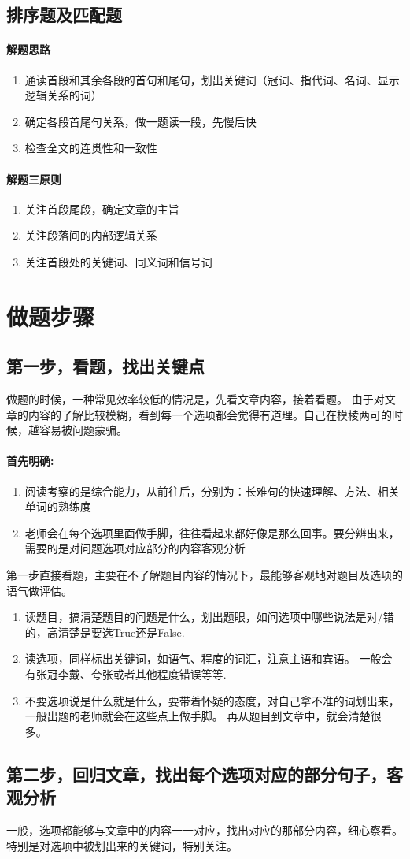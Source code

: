 \documentclass[a4paper]{ctexart}
\begin{document}
\subsection{排序题及匹配题}
\paragraph{解题思路}
\begin{enumerate}
    \item 通读首段和其余各段的首句和尾句，划出关键词（冠词、指代词、名词、显示逻辑关系的词）
    \item 确定各段首尾句关系，做一题读一段，先慢后快
    \item 检查全文的连贯性和一致性
\end{enumerate}
\paragraph{解题三原则}
\begin{enumerate}
    \item 关注首段尾段，确定文章的主旨
    \item 关注段落间的内部逻辑关系
    \item 关注首段处的关键词、同义词和信号词
\end{enumerate}


\section{做题步骤}
\subsection{第一步，看题，找出关键点}
做题的时候，一种常见效率较低的情况是，先看文章内容，接着看题。 由于对文章的内容的了解比较模糊，看到每一个选项都会觉得有道理。自己在模棱两可的时候，越容易被问题蒙骗。
\paragraph{首先明确:}
\begin {enumerate}
    \item 阅读考察的是综合能力，从前往后，分别为：长难句的快速理解、方法、相关单词的熟练度
    \item 老师会在每个选项里面做手脚，往往看起来都好像是那么回事。要分辨出来，需要的是对问题选项对应部分的内容客观分析
\end {enumerate}

第一步直接看题，主要在不了解题目内容的情况下，最能够客观地对题目及选项的语气做评估。
\begin {enumerate}
    \item 读题目，搞清楚题目的问题是什么，划出题眼，如问选项中哪些说法是对/错的，高清楚是要选True还是False.
    \item 读选项，同样标出关键词，如语气、程度的词汇，注意主语和宾语。 一般会有张冠李戴、夸张或者其他程度错误等等.
    \item 不要选项说是什么就是什么，要带着怀疑的态度，对自己拿不准的词划出来，一般出题的老师就会在这些点上做手脚。 再从题目到文章中，就会清楚很多。
\end {enumerate}

\subsection{第二步，回归文章，找出每个选项对应的部分句子，客观分析}
一般，选项都能够与文章中的内容一一对应，找出对应的那部分内容，细心察看。 特别是对选项中被划出来的关键词，特别关注。
\end{document}

